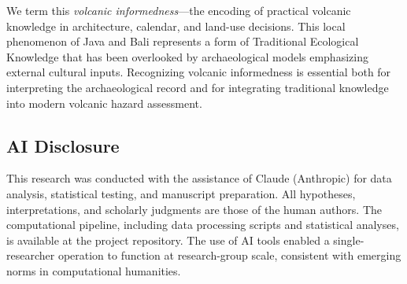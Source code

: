 \documentclass[12pt,a4paper]{article}
\begin{document}
We term this \emph{volcanic informedness}---the encoding of practical volcanic knowledge in architecture, calendar, and land-use decisions. This local phenomenon of Java and Bali represents a form of Traditional Ecological Knowledge that has been overlooked by archaeological models emphasizing external cultural inputs. Recognizing volcanic informedness is essential both for interpreting the archaeological record and for integrating traditional knowledge into modern volcanic hazard assessment.


\subsection*{AI Disclosure}

This research was conducted with the assistance of Claude (Anthropic) for data analysis, statistical testing, and manuscript preparation. All hypotheses, interpretations, and scholarly judgments are those of the human authors. The computational pipeline, including data processing scripts and statistical analyses, is available at the project repository. The use of AI tools enabled a single-researcher operation to function at research-group scale, consistent with emerging norms in computational humanities.



% 
\end{document}
